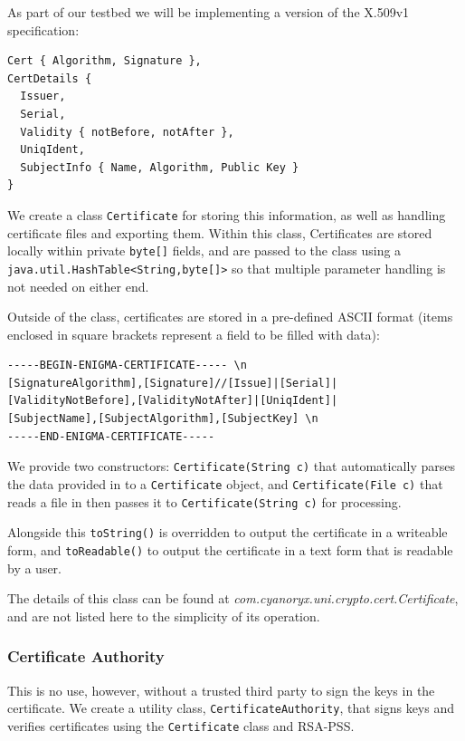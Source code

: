   As part of our testbed we will be implementing a version of the X.509v1 specification\cite{Kent:1993aa}: \\
  
  \begin{lstlisting}
Cert { Algorithm, Signature },
CertDetails {
  Issuer,
  Serial,
  Validity { notBefore, notAfter },
  UniqIdent,
  SubjectInfo { Name, Algorithm, Public Key }
}
  \end{lstlisting}
  
  We create a class \verb!Certificate! for storing this information, as well as handling certificate files and exporting them. Within this class, Certificates are stored locally within private \verb!byte[]! fields, and are passed to the class using a \verb!java.util.HashTable<String,byte[]>! so that multiple parameter handling is not needed on either end.
  
  Outside of the class, certificates are stored in a pre-defined ASCII format (items enclosed in square brackets represent a field to be filled with data): \\
  
  \begin{lstlisting}
-----BEGIN-ENIGMA-CERTIFICATE----- \n
[SignatureAlgorithm],[Signature]//[Issue]|[Serial]|
[ValidityNotBefore],[ValidityNotAfter]|[UniqIdent]|
[SubjectName],[SubjectAlgorithm],[SubjectKey] \n
-----END-ENIGMA-CERTIFICATE-----
\end{lstlisting}

  We provide two constructors: \verb!Certificate(String c)! that automatically parses the data provided in to a \verb!Certificate! object, and \verb!Certificate(File c)! that reads a file in then passes it to \verb!Certificate(String c)! for processing.
  
  Alongside this \verb!toString()! is overridden to output the certificate in a writeable form, and \verb!toReadable()! to output the certificate in a text form that is readable by a user.
  
  The details of this class can be found at \emph{com.cyanoryx.uni.crypto.cert.Certificate}, and are not listed here to the simplicity of its operation.
  
  \subsubsection{Certificate Authority}
  
  This is no use, however, without a trusted third party to sign the keys in the certificate. We create a utility class, \verb!CertificateAuthority!, that signs keys and verifies certificates using the \verb!Certificate! class and RSA-PSS. \\
  
